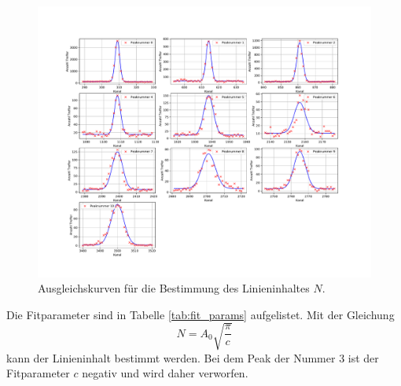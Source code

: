 \FloatBarrier
\begin{figure}
  \centering
  \caption{Ausgleichskurven für die Bestimmung des Linieninhaltes $N$.}
  \label{fig:subplots_01}
  \includegraphics[width=\textwidth,keepaspectratio]{figure/Subplot_01.pdf}
\end{figure}
\FloatBarrier
Die Fitparameter sind in Tabelle \ref{tab:fit_params} aufgelistet. Mit der Gleichung 
\begin{equation*}
  N = A_0\sqrt{\frac{\pi}{c}}
\end{equation*}
kann der Linieninhalt bestimmt werden. Bei dem Peak der Nummer 3 ist der Fitparameter $c$ negativ und wird daher verworfen.
\FloatBarrier
